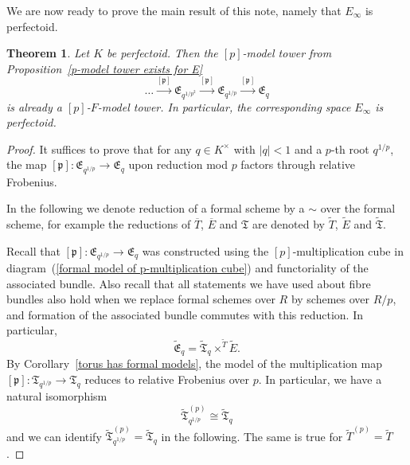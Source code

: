 \documentclass[11pt,oneside]{amsart}
\newtheorem{theorem}{Theorem}[section]
\theoremstyle{definition}
\theoremstyle{remark}
\begin{document}
	We are now ready to prove the main result of this note, namely that $E_\infty$ is perfectoid.
	\begin{framed}
	\begin{theorem}\label{p-F-model tower exists for E}
		Let $K$ be perfectoid. Then the $[p]$-model tower from Proposition~\ref{p-model tower exists for E}
		\[\dots \xrightarrow{[\mathfrak p]} \mathfrak E_{q^{1/p^2}}\xrightarrow{[\mathfrak p]} \mathfrak E_{q^{1/p}}\xrightarrow{[\mathfrak p]} \mathfrak E_q\]
		 is already a $[p]$-$F$-model tower.
		In particular, the corresponding space $E_\infty$ is perfectoid.
	\end{theorem}
	\end{framed}
	\begin{proof}
	
	It suffices to prove that for any $q\in K^\times$ with $|q|<1$ and a $p$-th root $q^{1/p}$, the map $[\mathfrak p]:\mathfrak E_{q^{1/p}}\xrightarrow{} \mathfrak E_q$ upon reduction mod $p$ factors through relative Frobenius.
	
	In the following we denote reduction of a formal scheme by a $\sim$ over the formal scheme, for example the reductions of $\overline{T}$, $\overline{E}$ and $\mathfrak T$ are denoted by $\tilde{T}$, $\tilde{E}$ and $\tilde{\mathfrak{T}}$.
	
		
	Recall that $[\mathfrak p]:\mathfrak E_{q^{1/p}}\xrightarrow{} \mathfrak E_q$ was constructed using the $[p]$-multiplication cube in diagram~(\ref{formal model of p-multiplication cube}) and functoriality of the associated bundle. 	
	Also recall that all statements we have used about fibre bundles also hold when we replace formal schemes over $R$ by schemes over $R/p$, and formation of the associated bundle commutes with this reduction. In particular,
	\[\tilde{\mathfrak{E}}_q = \tilde{\mathfrak T}_q\times^{\tilde{T}}\tilde E.\]
	By  Corollary~\ref{torus has formal models}, the model of the multiplication map $[\mathfrak p]:\mathfrak T_{q^{1/p}} \rightarrow \mathfrak T_{q}$ reduces to relative Frobenius over $p$. In particular, we have a natural isomorphism
	\[\tilde{\mathfrak T}_{q^{1/p}}^{(p)} \cong \tilde{\mathfrak T}_{q}\]
	and we can identify $\tilde{\mathfrak T}_{q^{1/p}}^{(p)} = \tilde{\mathfrak T}_{q}$ in the following. The same is true for $\tilde{T}^{(p)} = \tilde{T}$.
	

\end{proof}
\end{document}
